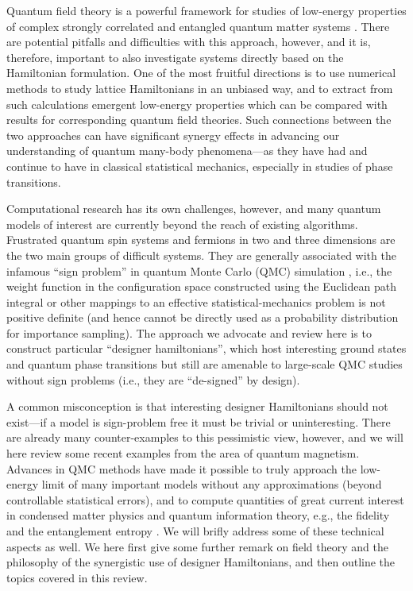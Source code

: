 \documentclass[range]{ar2e}
\begin{document}
Quantum field theory is a powerful framework for studies of low-energy properties of complex strongly 
correlated and entangled quantum matter systems \cite{Sachdev11}. There are potential pitfalls and difficulties 
with this approach, however, and it is, therefore, important to also investigate systems directly based on the Hamiltonian 
formulation. One of the most fruitful directions is to use numerical methods to study lattice Hamiltonians 
in an unbiased way, and to extract from such calculations emergent low-energy properties which can be 
compared with results for corresponding quantum field theories. Such connections between the two approaches 
can have significant synergy effects in advancing our understanding of quantum many-body phenomena---as they
have had and continue to have in classical statistical mechanics, especially in studies of phase transitions. 

Computational research has its own challenges, however, and many quantum models of interest are currently beyond the reach 
of existing algorithms. Frustrated quantum spin systems and fermions in two and three dimensions are the two main groups 
of difficult systems. They are generally associated with the infamous ``sign problem'' in quantum Monte Carlo (QMC) simulation
\cite{Loh90,Henelius00,Nyfeler08}, i.e., the weight function in the configuration space constructed using the Euclidean path 
integral or other mappings to an effective statistical-mechanics problem is not positive definite (and hence cannot be directly 
used as a probability distribution for importance sampling). The approach we advocate and review here is to construct particular 
``designer hamiltonians'', which host interesting ground states and quantum phase transitions but still are amenable to 
large-scale QMC studies without sign problems (i.e., they are ``de-signed'' by design). 

A common misconception is that interesting designer Hamiltonians should not exist---if a model is sign-problem 
free it must be trivial or uninteresting. There are already many counter-examples to this pessimistic view, 
however, and we will here review some recent examples from the area of quantum magnetism. Advances in QMC 
methods \cite{Sandvik91,Evertz93,Beard96,WormA,Sandvik99,Sandvik10a} have made it possible to truly approach the 
low-energy limit of many important models without any approximations (beyond controllable statistical errors), and to compute 
quantities of great current interest in condensed matter physics and quantum information theory, e.g., the fidelity 
\cite{Schwandt09,Degrandi11} and the entanglement entropy \cite{Hastings10, Melko10}. We will brifly address some of these technical 
aspects as well. We here first give some further remark on field theory and the philosophy of the synergistic use of 
designer Hamiltonians, and then outline the topics covered in this review.
\end{document}
